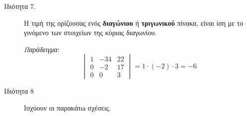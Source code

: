 \begin{description}
    \item[Ιδιότητα 7.] Η τιμή της ορίζουσας ενός \textbf{διαγώνιου} ή \textbf{τριγωνικού} πίνακα, είναι ίση με το γινόμενο των στοιχείων της κύριας διαγωνίου.

        \textit{Παράδειγμα}:
        \[
            \begin{vmatrix}
                1 & -34 & 22\\
                0 & -2 & 17 \\
                0 & 0 & 3 
            \end{vmatrix}=1\cdot (-2)\cdot 3= -6
        \]

    \item[Ιδιότητα 8] Ισχύουν οι παρακάτω σχέσεις.




\end{description}









